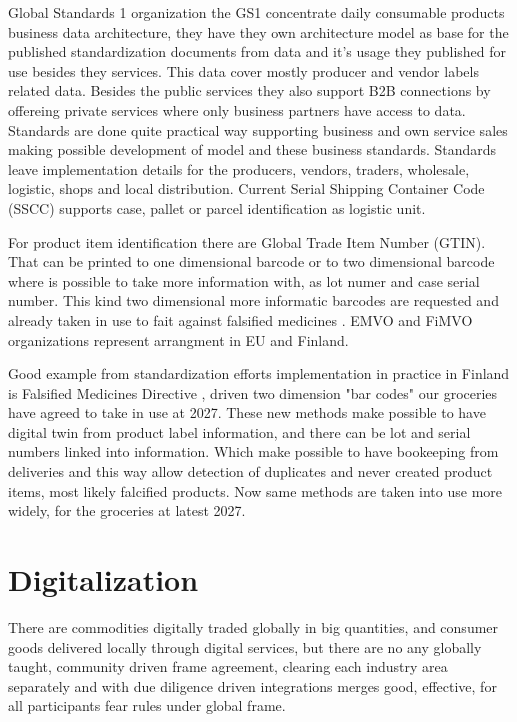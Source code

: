 Global Standards 1 organization the GS1\cite{GS1Standards} concentrate daily
consumable products business data architecture, they have they own architecture
model as base for the published standardization documents from data and it's
usage they published for use besides they services. This data cover mostly
producer and vendor labels related data. Besides the public services they also
support B2B connections by offereing private services where only business
partners have access to data. Standards are done quite practical way supporting
business and own service sales making possible development of model and these
business standards. Standards leave implementation details for the producers,
vendors, traders, wholesale, logistic, shops and local distribution. Current
Serial Shipping Container Code (SSCC)\cite{SSCC} supports case, pallet or
parcel identification as logistic unit.

For product item identification there are Global Trade Item Number
(GTIN)\cite{GTIN}. That can be printed to one dimensional barcode or to two
dimensional barcode where is possible to take more information with, as
lot numer and case serial number. This kind two dimensional more informatic
barcodes are requested and already taken in use to fait against falsified
medicines \cite{FalsifiedMedicines}. EMVO\cite{EMVO} and FiMVO\cite{FiMVO}
organizations represent arrangment in EU and Finland.

Good example from standardization efforts implementation in practice in
Finland is Falsified Medicines Directive
\cite{Falsified_Medicines_Directive}\cite{FalsifiedMedicines}\cite{EMVO}\cite{FiMVO},
driven two dimension "bar codes" our groceries have agreed to take in use
at 2027\cite{Finland2DcodesY27}. These new methods make possible to have
digital twin from product label information, and there can be lot and serial
numbers linked into information. Which make possible to have bookeeping from
deliveries and this way allow detection of duplicates and never created product
items, most likely falcified products. Now same methods are taken into use more
widely, for the groceries\cite{Finland2DcodesY27} at latest 2027.

\section{Digitalization}
\label{digitalization}
There are commodities digitally traded globally in big quantities, and consumer
goods delivered locally through digital services, but there are no any globally
taught, community driven frame agreement, clearing each industry area separately
and with due diligence driven integrations merges good, effective, for all
participants fear rules under global frame.

